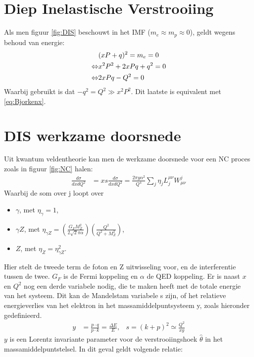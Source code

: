 \documentclass[a4paper,11pt]{article}
\numberwithin{equation}{section} %
\begin{document}
\newpage


\appendix
\section{Diep Inelastische Verstrooiing} \label{app:DIS}
Als men figuur \ref{fig:DIS} beschouwt in het IMF ($m_e \approx m_p \approx 0$), geldt wegens behoud van energie:
\begin{align}
&(xP+q)^2 = m_e = 0 \notag \\
\Leftrightarrow &x^2 P^2 + 2xPq + q^2 = 0 \notag \\
\Leftrightarrow &2xPq -Q^2=0
\end{align}
Waarbij gebruikt is dat $-q^2 = Q^2 \gg x^2P^2$. Dit laatste is equivalent met \eqref{eq:Bjorkenx}.

\section{DIS werkzame doorsnede} \label{app:SF}
Uit kwantum veldentheorie kan men de werkzame doorsnede voor een NC proces zoals in figuur \ref{fig:NC} halen:
\begin{align}
\frac{d\sigma}{dxdQ^2} &= xs \frac{d\sigma}{dxdQ^2} = \frac{2\pi y \alpha^2}{Q^4} \sum_j \eta_j L_j^{\mu \nu} W_{\mu \nu}^j
\end{align}
Waarbij de som over j loopt over
\begin{itemize}
  \item $\gamma$, met $\eta_\gamma=1$,
  \item $\gamma Z$, met $\eta_{\gamma Z} = \left( \frac{G_F M_Z^2}{2\sqrt{2}\pi \alpha} \right) \left(\frac{Q^2}{Q^2+M_Z^2} \right)$,
  \item $Z$, met $\eta_Z = \eta_{\gamma Z}^2$.
\end{itemize}
Hier stelt de tweede term de foton en Z uitwisseling voor, en de interferentie tussen de twee. $G_F$ is de Fermi koppeling en $\alpha$ de QED koppeling.
Er is naast $x$ en $Q^2$ nog een derde variabele nodig, die te maken heeft met de totale energie van het systeem.
Dit kan de Mandelstam variabele s zijn, of het relatieve energieverlies van het elektron in het massamiddelpuntsysteem y, zoals hieronder gedefinieerd.
\begin{align}
y &= \frac{p \cdot q}{p \cdot k} = \frac{\Delta E}{E} ,& s = (k+p)^2 \simeq \frac{Q^2}{xy}
\end{align}
$y$ is een Lorentz invariante parameter voor de verstrooiingshoek $\hat{\theta}$ in het massamiddelpuntstelsel.
In dit geval geldt volgende relatie:
\end{document}
